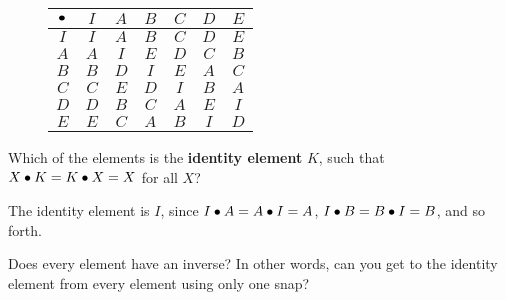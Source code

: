 \documentclass[../gatm_answers.tex]{subfiles}
\begin{document}
%      
\begin{figure}[h]     
	\begin{center}
		\begin{minipage}[b]{\textwidth}
			\centering
			\begin{tabular}{c|cccccc}
				\hline
				$\bullet$ & $I$ & $A$ & $B$ & $C$ & $D$ & $E$ \\ \hline
				\rowcolor{light-gray}
				$I$ & $I$ & $A$ & $B$ & $C$ & $D$ & $E$ \\
				$A$ & $A$ & $I$ & $E$ & $D$ & $C$ & $B$ \\
				\rowcolor{light-gray}
				$B$ & $B$ & $D$ & $I$ & $E$ & $A$ & $C$ \\
				$C$ & $C$ & $E$ & $D$ & $I$ & $B$ & $A$ \\
				\rowcolor{light-gray}
				$D$ & $D$ & $B$ & $C$ & $A$ & $E$ & $I$ \\
				$E$ & $E$ & $C$ & $A$ & $B$ & $I$ & $D$ \\ \hline
			\end{tabular}
			\vspace*{0.5\baselineskip}
		\end{minipage}
	\end{center}
	\vspace*{-2\baselineskip}
\end{figure}  

\begin{outer_problem}
\item Which of the elements is the \textbf{identity element} $K$, such that $X\bullet K = K\bullet X = X$ for all $X$? \label{prob:group_definition_start}
\end{outer_problem}

\noindent The identity element is $I$, since $I\bullet A = A\bullet I = A$, $I\bullet B = B\bullet I = B$, and so forth.

\begin{outer_problem}
\item Does every element have an inverse? In other words, can you get to the identity element from every element using only one snap?
\end{outer_problem}
\end{document}
